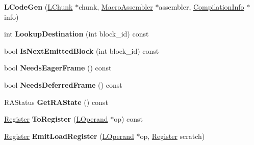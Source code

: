 \begin{DoxyCompactItemize}
\item 
{\bfseries L\+Code\+Gen} (\hyperlink{classv8_1_1internal_1_1_l_chunk}{L\+Chunk} $\ast$chunk, \hyperlink{classv8_1_1internal_1_1_macro_assembler}{Macro\+Assembler} $\ast$assembler, \hyperlink{classv8_1_1internal_1_1_compilation_info}{Compilation\+Info} $\ast$info)\hypertarget{classv8_1_1internal_1_1_l_code_gen_aed907f71b0a7b9401ce1c0c883ed449b}{}\label{classv8_1_1internal_1_1_l_code_gen_aed907f71b0a7b9401ce1c0c883ed449b}

\item 
int {\bfseries Lookup\+Destination} (int block\+\_\+id) const \hypertarget{classv8_1_1internal_1_1_l_code_gen_aed7b32e45855e787600f16ad151865c4}{}\label{classv8_1_1internal_1_1_l_code_gen_aed7b32e45855e787600f16ad151865c4}

\item 
bool {\bfseries Is\+Next\+Emitted\+Block} (int block\+\_\+id) const \hypertarget{classv8_1_1internal_1_1_l_code_gen_a679c74faee0e58ff843fdfa52dc927a9}{}\label{classv8_1_1internal_1_1_l_code_gen_a679c74faee0e58ff843fdfa52dc927a9}

\item 
bool {\bfseries Needs\+Eager\+Frame} () const \hypertarget{classv8_1_1internal_1_1_l_code_gen_a3487a9e332e1674eeac175bdd43851bd}{}\label{classv8_1_1internal_1_1_l_code_gen_a3487a9e332e1674eeac175bdd43851bd}

\item 
bool {\bfseries Needs\+Deferred\+Frame} () const \hypertarget{classv8_1_1internal_1_1_l_code_gen_aecf1941fcb8a169141d3e26237c64c67}{}\label{classv8_1_1internal_1_1_l_code_gen_aecf1941fcb8a169141d3e26237c64c67}

\item 
R\+A\+Status {\bfseries Get\+R\+A\+State} () const \hypertarget{classv8_1_1internal_1_1_l_code_gen_a2d87e0112246c3433fc8da4ed44f3b22}{}\label{classv8_1_1internal_1_1_l_code_gen_a2d87e0112246c3433fc8da4ed44f3b22}

\item 
\hyperlink{structv8_1_1internal_1_1_register}{Register} {\bfseries To\+Register} (\hyperlink{classv8_1_1internal_1_1_l_operand}{L\+Operand} $\ast$op) const \hypertarget{classv8_1_1internal_1_1_l_code_gen_ab3dda8b86a7b8303006365eb51069db1}{}\label{classv8_1_1internal_1_1_l_code_gen_ab3dda8b86a7b8303006365eb51069db1}

\item 
\hyperlink{structv8_1_1internal_1_1_register}{Register} {\bfseries Emit\+Load\+Register} (\hyperlink{classv8_1_1internal_1_1_l_operand}{L\+Operand} $\ast$op, \hyperlink{structv8_1_1internal_1_1_register}{Register} scratch)\hypertarget{classv8_1_1internal_1_1_l_code_gen_aae04184e582568b386844732951cdda2}{}\label{classv8_1_1internal_1_1_l_code_gen_aae04184e582568b386844732951cdda2}


\end{DoxyCompactItemize}

